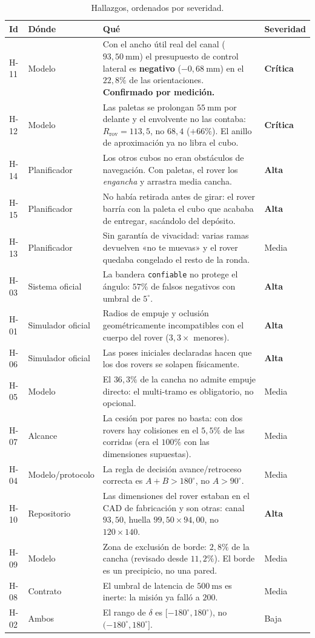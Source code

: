 \documentclass[11pt,a4paper]{article}
\newcommand{\grados}{^{\circ}}
\begin{document}
\begin{table}[htbp]
\centering
\small
\caption{Hallazgos, ordenados por severidad.}
\begin{tabular}{llp{7.4cm}l}
\toprule
Id & Dónde & Qué & Severidad \\
\midrule
H-11 & Modelo & Con el ancho útil real del canal ($93{,}50\ \mathrm{mm}$) el presupuesto
de control lateral es \textbf{negativo} ($-0{,}68\ \mathrm{mm}$) en el $22{,}8\%$ de las
orientaciones. \textbf{Confirmado por medición.} & \textbf{Crítica} \\
H-12 & Modelo & Las paletas se prolongan $55\ \mathrm{mm}$ por delante y el envolvente
no las contaba: $R_{\mathrm{rov}} = 113{,}5$, no $68{,}4$ ($+66\%$). El anillo de
aproximación ya no libra el cubo. & \textbf{Crítica} \\
H-14 & Planificador & Los otros cubos no eran obstáculos de navegación. Con paletas, el
rover los \emph{engancha} y arrastra media cancha. & \textbf{Alta} \\
H-15 & Planificador & No había retirada antes de girar: el rover barría con la paleta el
cubo que acababa de entregar, sacándolo del depósito. & \textbf{Alta} \\
H-13 & Planificador & Sin garantía de vivacidad: varias ramas devuelven «no te muevas» y
el rover quedaba congelado el resto de la ronda. & Media \\
H-03 & Sistema oficial & La bandera \texttt{confiable} no protege el ángulo:
$57\%$ de falsos negativos con umbral de $5\grados$. & \textbf{Alta} \\
H-01 & Simulador oficial & Radios de empuje y oclusión geométricamente incompatibles
con el cuerpo del rover ($3{,}3\times$ menores). & \textbf{Alta} \\
H-06 & Simulador oficial & Las poses iniciales declaradas hacen que los dos rovers se
solapen físicamente. & \textbf{Alta} \\
H-05 & Modelo & El $36{,}3\%$ de la cancha no admite empuje directo: el multi-tramo es
obligatorio, no opcional. & Media \\
H-07 & Alcance & La cesión por pares no basta: con dos rovers hay colisiones en el
$5{,}5\%$ de las corridas (era el $100\%$ con las dimensiones supuestas). & Media \\
H-04 & Modelo/protocolo & La regla de decisión avance/retroceso correcta es
$A+B>180\grados$, no $A>90\grados$. & Media \\
H-10 & Repositorio & Las dimensiones del rover estaban en el CAD de fabricación y son
otras: canal $93{,}50$, huella $99{,}50\times94{,}00$, no $120\times140$. & \textbf{Alta} \\
H-09 & Modelo & Zona de exclusión de borde: $2{,}8\%$ de la cancha (revisado desde
$11{,}2\%$). El borde es un precipicio, no una pared. & Media \\
H-08 & Contrato & El umbral de latencia de $500\ \mathrm{ms}$ es inerte: la misión ya
falló a $200$. & Media \\
H-02 & Ambos & El rango de $\delta$ es $[-180\grados,180\grados)$, no
$(-180\grados,180\grados]$. & Baja \\
\bottomrule
\end{tabular}
\end{table}
\end{document}
